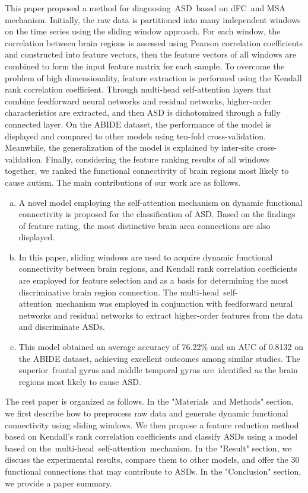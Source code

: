\documentclass[a4paper]{cas-dc}
\begin{document}
This paper proposed a method for diagnosing ASD based on dFC and MSA mechanism. Initially, the raw data is partitioned into many independent windows on the time series using the sliding window approach. For each window, the correlation between brain regions is assessed using Pearson correlation coefficients and constructed into feature vectors, then the feature vectors of all windows are combined to form the input feature matrix for each sample. To overcome the problem of high dimensionality, feature extraction is performed using the Kendall rank correlation coefficient. Through multi-head self-attention layers that combine feedforward neural networks and residual networks, higher-order characteristics are extracted, and then ASD is dichotomized through a fully connected layer. On the ABIDE dataset, the performance of the model is displayed and compared to other models using ten-fold cross-validation. Meanwhile, the generalization of the model is explained by inter-site cross-validation. Finally, considering the feature ranking results of all windows together, we ranked the functional connectivity of brain regions most likely to cause autism. The main contributions of our work are as follows.
\begin{enumerate}[a)]
	\item A novel model employing the self-attention mechanism on dynamic functional connectivity is proposed for the classification of ASD. Based on the findings of feature rating, the most distinctive brain area connections are also displayed.
	\item In this paper, sliding windows are used to acquire dynamic functional connectivity between brain regions, and Kendall rank correlation coefficients are employed for feature selection and as a basis for determining the most discriminative brain region connection. The multi-head self-attention mechanism was employed in conjunction with feedforward neural networks and residual networks to extract higher-order features from the data and discriminate ASDs.
	\item This model obtained an average accuracy of 76.22\% and an AUC of 0.8132 on the ABIDE dataset, achieving excellent outcomes among similar studies. The superior frontal gyrus and middle temporal gyrus are identified as the brain regions most likely to cause ASD.
\end{enumerate}  
The rest paper is organized as follows. In the "Materials and Methods" section, we first describe how to preprocess raw data and generate dynamic functional connectivity using sliding windows. We then propose a feature reduction method based on Kendall's rank correlation coefficients and classify ASDs using a model based on the multi-head self-attention mechanism. In the "Result" section, we discuss the experimental results, compare them to other models, and offer the 30 functional connections that may contribute to ASDs. In the "Conclusion" section, we provide a paper summary.
\end{document}
